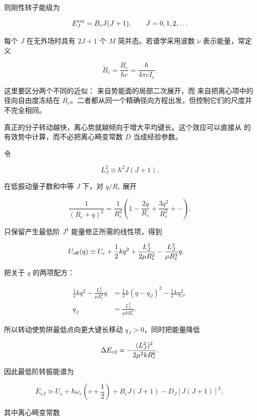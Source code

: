 则刚性转子能级为

\begin{equation}
E_J^{\rm rot}=B_eJ(J+1),
\qquad
J=0,1,2,\ldots
\label{eq:diatomic-rigid-rotor}
\end{equation}

每个 \(J\) 在无外场时具有 \(2J+1\) 个 \(M\) 简并态。若谱学采用波数 \(\tilde\nu\) 表示能量，常定义

\[
\widetilde B_e=\frac{B_e}{hc}
=\frac{\hbar}{4\pi c I_e}.
\]

这里要区分两个不同的近似： 来自势能面的局部二次展开，而  来自把离心项中的径向自由度冻结在 \(R_e\)。二者都从同一个精确径向方程出发，但控制它们的尺度并不完全相同。

真正的分子转动越快，离心势就越倾向于增大平均键长。这个效应可以直接从  的有效势中计算，而不必把离心畸变常数 \(D\) 当成经验参数。

令

\[
L_J^2\equiv\hbar^2J(J+1).
\]

在低振动量子数和中等 \(J\) 下，对 \(q/R_e\) 展开

\[
\frac1{(R_e+q)^2}
=\frac1{R_e^2}
\left(1-\frac{2q}{R_e}+\frac{3q^2}{R_e^2}+\cdots\right).
\]

只保留产生最低阶 \(J^4\) 能量修正所需的线性项，得到

\begin{align*}
U_{\rm eff}(q)
&\simeq
U_e+\frac12kq^2
+\frac{L_J^2}{2\mu R_e^2}
-\frac{L_J^2}{\mu R_e^3}q.
\end{align*}

把关于 \(q\) 的两项配方：

\begin{align*}
\frac12kq^2-\frac{L_J^2}{\mu R_e^3}q
&=\frac12k(q-q_J)^2
-\frac12kq_J^2,\\
q_J&=\frac{L_J^2}{\mu kR_e^3}.
\end{align*}

所以转动使势阱最低点向更大键长移动 \(q_J>0\)，同时把能量降低

\[
\Delta E_{\rm cd}
=-\frac{(L_J^2)^2}{2\mu^2kR_e^6}.
\]

因此最低阶转振能谱为

\begin{equation}
E_{vJ}
\simeq
U_e+\hbar\omega_e\left(v+\frac12\right)
+B_eJ(J+1)
-D_J[J(J+1)]^2,
\label{eq:rovib-centrifugal-spectrum}
\end{equation}

其中离心畸变常数

